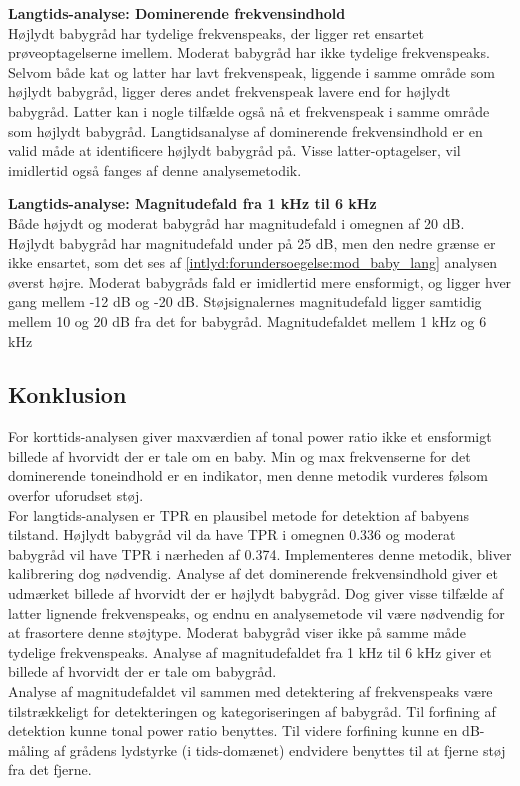 \textbf{Langtids-analyse: Dominerende frekvensindhold}	\\
Højlydt babygråd har tydelige frekvenspeaks, der ligger ret ensartet prøveoptagelserne imellem. Moderat babygråd har ikke tydelige frekvenspeaks. Selvom både kat og latter har lavt frekvenspeak, liggende i samme område som højlydt babygråd, ligger deres andet frekvenspeak lavere end for højlydt babygråd. Latter kan i nogle tilfælde også nå et frekvenspeak i samme område som højlydt babygråd. Langtidsanalyse af dominerende frekvensindhold er en valid måde at identificere højlydt babygråd på. Visse latter-optagelser, vil imidlertid også fanges af denne analysemetodik.

\textbf{Langtids-analyse: Magnitudefald fra 1 kHz til 6 kHz}	\\
Både højydt og moderat babygråd har magnitudefald i omegnen af 20 dB. Højlydt babygråd har magnitudefald under på 25 dB, men den nedre grænse er ikke ensartet, som det ses af \ref{intlyd:forundersoegelse:mod_baby_lang} analysen øverst højre. Moderat babygråds fald er imidlertid mere ensformigt, og ligger hver gang mellem -12 dB og -20 dB. Støjsignalernes magnitudefald ligger samtidig mellem 10 og 20 dB fra det for babygråd. Magnitudefaldet mellem 1 kHz og 6 kHz

\newpage
\subsection{Konklusion}
For korttids-analysen giver maxværdien af tonal power ratio ikke et ensformigt billede af hvorvidt der er tale om en baby. Min og max frekvenserne for det dominerende toneindhold er en indikator, men denne metodik vurderes følsom overfor uforudset støj. \\
For langtids-analysen er TPR en plausibel metode for detektion af babyens tilstand. Højlydt babygråd vil da have TPR i omegnen 0.336 og moderat babygråd vil have TPR i nærheden af 0.374. Implementeres denne metodik, bliver kalibrering dog nødvendig. Analyse af det dominerende frekvensindhold giver et udmærket billede af hvorvidt der er højlydt babygråd. Dog giver visse tilfælde af latter lignende frekvenspeaks, og endnu en analysemetode vil være nødvendig for at frasortere denne støjtype. Moderat babygråd viser ikke på samme måde tydelige frekvenspeaks. Analyse af magnitudefaldet fra 1 kHz til 6 kHz giver et billede af hvorvidt der er tale om babygråd. \\
Analyse af magnitudefaldet vil sammen med detektering af frekvenspeaks være tilstrækkeligt for detekteringen og kategoriseringen af babygråd. Til forfining af detektion kunne tonal power ratio benyttes. Til videre forfining kunne en dB-måling af grådens lydstyrke (i tids-domænet) endvidere benyttes til at fjerne støj fra det fjerne. 